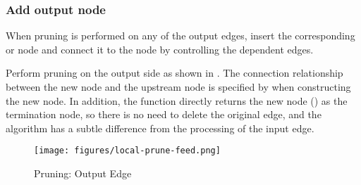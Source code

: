 \subsubsection{Add output node}
When pruning is performed on any of the output edges, insert the corresponding  or  node and connect it to the  node by controlling the dependent edges.

Perform pruning on the output side as shown in . The connection relationship between the new node and the upstream node is specified by  when constructing the new node. In addition, the function directly returns the new node () as the termination node, so there is no need to delete the original edge, and the algorithm has a subtle difference from the processing of the input edge.

\begin{figure}[H]
  \centering
  \texttt{[image: figures/local-prune-feed.png]}
  \caption{Pruning: Output Edge}
  \label{fig:local-prune-fetch}
\end{figure}

